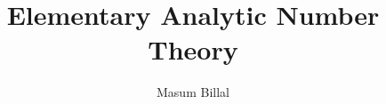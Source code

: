 \documentclass[12pt,leqno]{book}
\title{Elementary Analytic Number Theory}
\author{Masum Billal}
\theoremstyle{definition}
\begin{document}
    \frontmatter
    
    \maketitle
    \tableofcontents
    
    \printnomenclature
    \mainmatter
    \begin{refsection}
        
        \printbibliography
    \end{refsection}

	\begin{refsection}
		
        
    \end{refsection}
    \backmatter
    \printglossary[type=\acronymtype,title={List of Acronyms}]
    \printglossary[title=Glossary]
    \printindex
\end{document}
